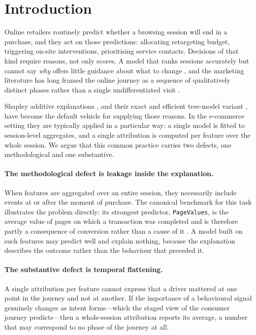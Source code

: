 \documentclass[review,3p,times,authoryear]{elsarticle}   %
\begin{document}
\section{Introduction}

Online retailers routinely predict whether a browsing session will end in a
purchase, and they act on those predictions: allocating retargeting budget,
triggering on-site interventions, prioritising service contacts. Decisions of that
kind require reasons, not only scores. A model that ranks sessions accurately but
cannot say \emph{why} offers little guidance about what to change
\citep{rudin2019stop}, and the marketing literature has long framed the online
journey as a sequence of qualitatively distinct phases rather than a single
undifferentiated visit \citep{bucklin2003model,lemon2016understanding,moe2003buying}.

Shapley additive explanations \citep{lundberg2017unified}, and their exact and
efficient tree-model variant \citep{lundberg2020local}, have become the default
vehicle for supplying those reasons. In the e-commerce setting they are typically
applied in a particular way: a single model is fitted to session-level aggregates,
and a single attribution is computed per feature over the whole session. We argue
that this common practice carries two defects, one methodological and one
substantive.

\paragraph{The methodological defect is leakage inside the explanation.}
When features are aggregated over an entire session, they necessarily include
events at or after the moment of purchase. The canonical benchmark for this task
illustrates the problem directly: its strongest predictor, \texttt{PageValues}, is
the average value of pages on which a transaction was completed and is therefore
partly a consequence of conversion rather than a cause of it
\citep{sakar2019real}. A model built on such features may predict well and explain
nothing, because the explanation describes the outcome rather than the behaviour
that preceded it.

\paragraph{The substantive defect is temporal flattening.}
A single attribution per feature cannot express that a driver mattered at one
point in the journey and not at another. If the importance of a behavioural signal
genuinely changes as intent forms---which the staged view of the consumer journey
predicts---then a whole-session attribution reports its average, a number that may
correspond to no phase of the journey at all.
\end{document}
